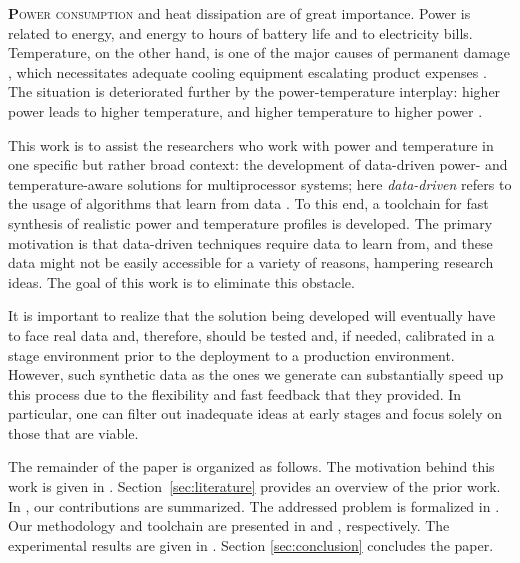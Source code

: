 \lettrine[findent=0.3em, nindent=0em]{\textbf{P}}{ower consumption} and heat
dissipation are of great importance. Power is related to energy, and energy to
hours of battery life and to electricity bills. Temperature, on the other hand,
is one of the major causes of permanent damage \cite{jedec}, which necessitates
adequate cooling equipment escalating product expenses \cite{chaudhry2015}. The
situation is deteriorated further by the power-temperature interplay: higher
power leads to higher temperature, and higher temperature to higher power
\cite{liu2007}.

This work is to assist the researchers who work with power and temperature in
one specific but rather broad context: the development of data-driven power- and
temperature-aware solutions for multiprocessor systems; here \emph{data-driven}
refers to the usage of algorithms that learn from data \cite{bishop2006}. To
this end, a toolchain for fast synthesis of realistic power and temperature
profiles is developed. The primary motivation is that data-driven techniques
require data to learn from, and these data might not be easily accessible for a
variety of reasons, hampering research ideas. The goal of this work is to
eliminate this obstacle.

It is important to realize that the solution being developed will eventually
have to face real data and, therefore, should be tested and, if needed,
calibrated in a stage environment prior to the deployment to a production
environment. However, such synthetic data as the ones we generate can
substantially speed up this process due to the flexibility and fast feedback
that they provided. In particular, one can filter out inadequate ideas at early
stages and focus solely on those that are viable.

The remainder of the paper is organized as follows. The motivation behind this
work is given in . Section~\ref{sec:literature} provides an
overview of the prior work. In , our contributions are
summarized. The addressed problem is formalized in . Our
methodology and toolchain are presented in  and
, respectively. The experimental results are given in
. Section \ref{sec:conclusion} concludes the paper.
